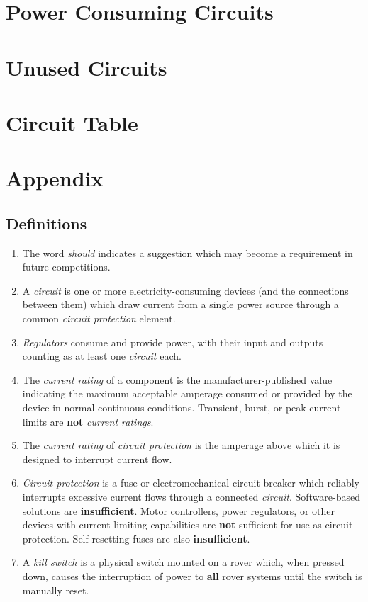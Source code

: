 \section{Power Consuming Circuits}

\section{Unused Circuits}

\section{Circuit Table}

    \clearpage

\section{Appendix}

    \subsection{Definitions}

    \begin{enumerate}
        \item The word \textit{should} indicates a suggestion which may become a requirement in future competitions.
        \item A \textit{circuit} is one or more electricity-consuming devices (and the connections between them) which draw current from a single power source through a common \textit{circuit protection} element.
        \item \textit{Regulators} consume and provide power, with their input and outputs counting as at least one \textit{circuit} each.
        \item The \textit{current rating} of a component is the manufacturer-published value indicating the maximum acceptable amperage consumed or provided by the device in normal continuous conditions. Transient, burst, or peak current limits are \textbf{not} \textit{current ratings}.
        \item The \textit{current rating} of \textit{circuit protection} is the amperage above which it is designed to interrupt current flow.
        \item \textit{Circuit protection} is a fuse or electromechanical circuit-breaker which reliably interrupts excessive current flows through a connected \textit{circuit}. Software-based solutions are \textbf{insufficient}. Motor controllers, power regulators, or other devices with current limiting capabilities are \textbf{not} sufficient for use as circuit protection. Self-resetting fuses are also \textbf{insufficient}.
        \item A \textit{kill switch} is a physical switch mounted on a rover which, when pressed down, causes the interruption of power to \textbf{all} rover systems until the switch is manually reset.
    \end{enumerate}


